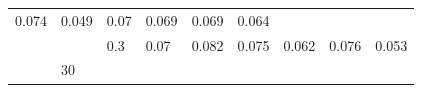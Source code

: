 \documentclass[12pt,oneside,a4paper]{reedthesis}
\begin{document}
\begin{longtable}[]{@{}lllllllll@{}}
\begin{minipage}[t]{0.08\columnwidth}
0.074\strut
\end{minipage} & \begin{minipage}[t]{0.08\columnwidth}\raggedright
0.049\strut
\end{minipage} & \begin{minipage}[t]{0.08\columnwidth}\raggedright
0.07\strut
\end{minipage} & \begin{minipage}[t]{0.08\columnwidth}\raggedright
0.069\strut
\end{minipage} & \begin{minipage}[t]{0.08\columnwidth}\raggedright
0.069\strut
\end{minipage} & \begin{minipage}[t]{0.08\columnwidth}\raggedright
0.064\strut
\end{minipage}\tabularnewline
\begin{minipage}[t]{0.12\columnwidth}\raggedright
\strut
\end{minipage} & \begin{minipage}[t]{0.09\columnwidth}\raggedright
\strut
\end{minipage} & \begin{minipage}[t]{0.06\columnwidth}\raggedright
0.3\strut
\end{minipage} & \begin{minipage}[t]{0.08\columnwidth}\raggedright
0.07\strut
\end{minipage} & \begin{minipage}[t]{0.08\columnwidth}\raggedright
0.082\strut
\end{minipage} & \begin{minipage}[t]{0.08\columnwidth}\raggedright
0.075\strut
\end{minipage} & \begin{minipage}[t]{0.08\columnwidth}\raggedright
0.062\strut
\end{minipage} & \begin{minipage}[t]{0.08\columnwidth}\raggedright
0.076\strut
\end{minipage} & \begin{minipage}[t]{0.08\columnwidth}\raggedright
0.053\strut
\end{minipage}\tabularnewline
\begin{minipage}[t]{0.12\columnwidth}\raggedright
\strut
\end{minipage} & \begin{minipage}[t]{0.09\columnwidth}\raggedright
30\strut
\end{minipage} & \begin{minipage}[t]{0.06\columnwidth}\raggedright

\end{minipage}
\end{longtable}
\end{document}
